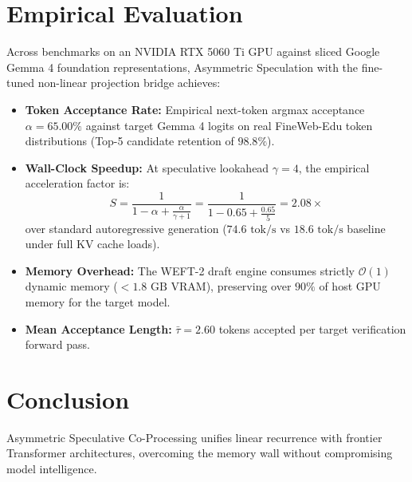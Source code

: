 \documentclass[11pt,a4paper]{article}
\begin{document}
\section{Empirical Evaluation}
Across benchmarks on an NVIDIA RTX 5060 Ti GPU against sliced Google Gemma 4 foundation representations, Asymmetric Speculation with the fine-tuned non-linear projection bridge achieves:
\begin{itemize}
    \item \textbf{Token Acceptance Rate:} Empirical next-token argmax acceptance $\alpha = 65.00\%$ against target Gemma 4 logits on real FineWeb-Edu token distributions (Top-5 candidate retention of $98.8\%$).
    \item \textbf{Wall-Clock Speedup:} At speculative lookahead $\gamma = 4$, the empirical acceleration factor is:
    \begin{equation}
    S = \frac{1}{1 - \alpha + \frac{\alpha}{\gamma + 1}} = \frac{1}{1 - 0.65 + \frac{0.65}{5}} = 2.08\times
    \end{equation}
    over standard autoregressive generation ($74.6\text{ tok/s}$ vs $18.6\text{ tok/s}$ baseline under full KV cache loads).
    \item \textbf{Memory Overhead:} The WEFT-2 draft engine consumes strictly $\mathcal{O}(1)$ dynamic memory ($< 1.8\text{ GB}$ VRAM), preserving over $90\%$ of host GPU memory for the target model.
    \item \textbf{Mean Acceptance Length:} $\bar{\tau} = 2.60$ tokens accepted per target verification forward pass.
\end{itemize}

\section{Conclusion}
Asymmetric Speculative Co-Processing unifies linear recurrence with frontier Transformer architectures, overcoming the memory wall without compromising model intelligence.
\end{document}
